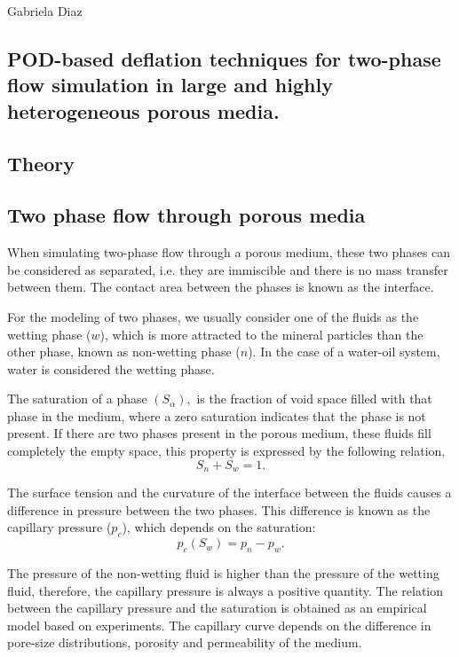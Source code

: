 \documentclass{article}
\date{}
\begin{document}
\begin{flushright} Gabriela Diaz \end{flushright}

\subsection*{POD-based deflation techniques for two-phase flow simulation in large
and highly heterogeneous porous media.}

\subsection*{Theory}

 \subsection*{Two phase flow through porous media}\label{fpm}
 
\hspace{0.5cm}When simulating two-phase flow through a porous medium, these two phases
can be considered as separated, i.e. they are immiscible and there is no mass transfer between 
them. 
The contact area between the phases is known as the interface.\par
For the modeling of two phases, we 
usually consider one of the fluids as the wetting phase ($w$), which is more attracted to the 
mineral particles than the other phase, known as non-wetting phase ($n$). In the case of a 
water-oil system, water is considered
the wetting phase. \par
The saturation of a phase $(S_{\alpha}),$ is the fraction of void space filled with that phase
in the 
medium, where a zero saturation indicates that the phase is not present.
If there are two phases present in the porous medium, these fluids fill completely 
the empty space, this property is expressed by the following relation,
\begin{equation}\label{eq:satrel}
 S_n+S_w=1.
\end{equation}\par
The surface tension and the curvature of the interface between the fluids causes a difference 
in pressure
between the two phases. 
This difference is known as the capillary pressure ($p_c$), which depends on the saturation:
\begin{equation}\label{eq:cappress}
 p_c(S_w)=p_n-p_w.
\end{equation}\par
The pressure of the non-wetting fluid is higher than the pressure of the wetting fluid, therefore, the capillary pressure is always a positive quantity. 
The relation between the capillary pressure and the saturation is obtained as an empirical model based on experiments. 
The capillary curve depends on the difference in pore-size 
distributions, porosity and permeability of the medium.
\end{document}
